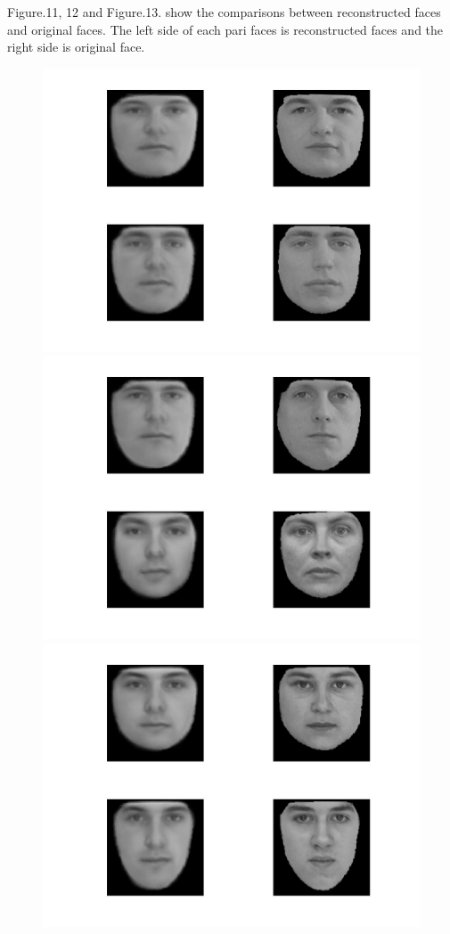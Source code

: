 \documentclass[12pt]{ctexart}
\begin{document}
\begin{enumerate}
Figure.11, 12 and Figure.13. show the comparisons between reconstructed faces and original faces. The left side of each pari faces is reconstructed faces and the right side is original face. 
\begin{figure}[H]
  \centering
\includegraphics[scale=0.18]{c_rec_face_wf1.jpg}
\includegraphics[scale=0.18]{c_rec_face_wf2.jpg}
\includegraphics[scale=0.18]{c_rec_face_wf3.jpg}

\end{figure}
\end{enumerate}
\end{document}
